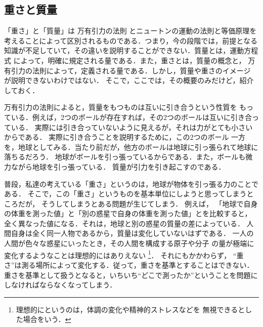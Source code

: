         \subsection{重さと質量}
            \begin{mycomment}
                「重さ」と「質量」は 万有引力の法則 とニュートンの運動の法則と等価原理を
                考えることによって区別されるものである．つまり，今の段階では，前提となる
                知識が不足していて，その違いを説明することができない．質量とは，運動方程式
                によって，明確に規定される量である．また，重さとは，質量の概念と，
                万有引力の法則によって，定義される量である．しかし，質量や重さのイメージ
                が説明できないわけではない．
                そこで，ここでは，その概要のみだけど，紹介しておく．
            \end{mycomment}

            万有引力の法則によると，質量をもつものは互いに引き合うという性質を
            もっている．例えば，2つのボールが存在すれば，その2つのボールは互いに引き合っている．
            実際には引き合っていないように見えるが，それは力がとても小さいからである．
            実際に引き合うことを説明するために，この2つのボール
            一方を，地球としてみる．当たり前だが，他方のボールは地球に引っ張られて地球に落ちるだろう．
            地球がボールを引っ張っているからである．また，ボールも微力ながら地球を引っ張っている．
            質量が引力を引き起こすのである．

            普段，私達の考えている「重さ」というのは，地球が物体を引っ張る力のことである．
            そこで，この「重さ」というものを基本単位にしようと思ってしまうところだが，
            そうしてしまうとある問題が生じてしまう．
            例えば，
            「地球で自身の体重を測った値」と「別の惑星で自身の体重を測った値」とを比較すると，
            全く異なった値になる．それは，地球と別の惑星の質量の差によっている．
            人間自身は全く同一人物であるから，質量は変化していないはずである．
            一人の人間が色々な惑星にいったとき，その人間を構成する原子や分子
            の量が極端に変化するようなことは理想的にはありえない
                \footnote{
                    理想的にというのは，体調の変化や精神的ストレスなどを
                    無視できるとした場合をいう．
                }．
            それにもかかわらず，
            “重さ”は測る場所によって変化する．従って，重さを基準とすることはできない．
            重さを基準として扱うとなると，いちいち“どこで測ったか”ということを問題に
            しなければならなくなってしまう．

